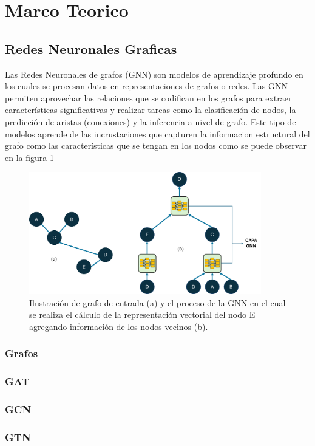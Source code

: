 \section{Marco Teorico}

\subsection{Redes Neuronales Graficas}

Las Redes Neuronales de grafos (GNN) son modelos de aprendizaje profundo en los cuales se procesan datos en representaciones de grafos o redes. Las GNN permiten aprovechar las relaciones que se codifican en los grafos para extraer características significativas y realizar tareas como la clasificación de nodos, la predicción de aristas (conexiones) y la inferencia a nivel de grafo. Este tipo de modelos aprende de las incrustaciones que capturen la informacion estructural del grafo como las características que se tengan en los nodos como se puede observar en la figura \ref{fig:GNN}

\begin{figure}[h!]
    \centering
    \includegraphics[width=0.9\textwidth]{Imagenes/GNN.png}
    \caption{Ilustración de grafo de entrada (a) y el proceso de la GNN en el cual se realiza el cálculo de la representación vectorial del nodo E agregando información de los nodos vecinos (b).}
    \label{fig:GNN}
\end{figure}

\subsubsection{Grafos}
\subsubsection{GAT}
\subsubsection{GCN}
\subsubsection{GTN}